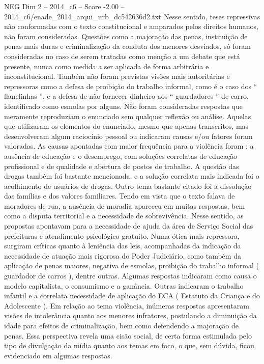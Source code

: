 \begin{textsample}{NEG Dim 2 – 2014\_c6 – Score -2.00 – 2014\_c6/enade\_2014\_arqui\_urb\_dc542636d2.txt}
Nesse sentido, teses repressivas não conformadas com o texto constitucional e amparados pelos direitos humanos, não foram consideradas.
Questões como a majoração das penas, instituição de penas mais duras e criminalização da conduta dos menores desviados, só foram consideradas no caso de serem tratadas como menção a um debate que está presente, nunca como medida a ser aplicada de forma arbitrária e inconstitucional.
Também não foram previstas visões mais autoritárias e repressoras como a defesa de proibição do trabalho informal, como é o caso dos “ flanelinhas ”, e a defesa de não fornecer dinheiro aos “ guardadores ” de carro, identificado como esmolas por alguns.
Não foram consideradas respostas que meramente reproduziam o enunciado sem qualquer reflexão ou análise.
Aquelas que utilizaram os elementos do enunciado, mesmo que apenas transcritos, mas desenvolveram algum raciocínio pessoal ou indicaram causas e/ou fatores foram valoradas.
As causas apontadas com maior frequência para a violência foram : a ausência de educação e o desemprego, com soluções correlatas de educação profissional e de qualidade e abertura de postos de trabalho.
A questão das drogas também foi bastante mencionada, e a solução correlata mais indicada foi o acolhimento de usuários de drogas.
Outro tema bastante citado foi a dissolução das famílias e dos valores familiares.
Tendo em vista que o texto falava de moradores de rua, a ausência de moradia apareceu em muitas respostas, bem como a disputa territorial e a necessidade de sobrevivência.
Nesse sentido, as propostas apontavam para a necessidade de ajuda da área de Serviço Social das prefeituras e atendimento psicológico gratuito.
Numa ótica mais repressora, surgiram críticas quanto à leniência das leis, acompanhadas da indicação da necessidade de atuação mais rigorosa do Poder Judiciário, como também da aplicação de penas maiores, negativa de esmolas, proibição do trabalho informal ( guardador de carros ), dentre outras.
Algumas respostas indicaram como causa o modelo capitalista, o consumismo e a ganância.
Outras indicaram o trabalho infantil e a correlata necessidade de aplicação do ECA ( Estatuto da Criança e do Adolescente ).
Em relação ao tema violência, inúmeras respostas apresentaram visões de intolerância quanto aos menores infratores, postulando a diminuição da idade para efeitos de criminalização, bem como defendendo a majoração de penas.
Essa perspectiva revela uma cisão social, de certa forma estimulada pelo tipo de divulgação da mídia quanto aos temas em foco, o que, sem dúvida, ficou evidenciado em algumas respostas.

\end{textsample}

